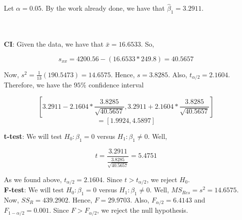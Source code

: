 Let $\alpha=0.05$. By the work already done, we have that $\hat{\beta}_1=3.2911$.\\\\

\begin{solution}\renewcommand{\qedsymbol}{}\ \\
    \textbf{CI}: Given the data, we have that $\bar{x}=16.6533$. So,
    
    $$s_{xx}=4200.56-(16.6533*249.8)=40.5657$$
    
    Now, $s^2=\frac{1}{13}(190.5473)=14.6575$. Hence, $s=3.8285$. Also, $t_{\alpha/2}=2.1604$.
    Therefore, we have the $95\%$ confidence interval
    
    $$[3.2911-2.1604*\frac{3.8285}{\sqrt{40.5657}},3.2911+2.1604*\frac{3.8285}{\sqrt{40.5657}}]$$
    $$=[1.9924,4.5897]$$

    \textbf{t-test}: We will test $H_0:\beta_1=0$ versus $H_1:\beta_1\neq0$. Well,
    
    $$t=\frac{3.2911}{\frac{3.8285}{\sqrt{40.5657}}}=5.4751$$
    
    As we found above, $t_{\alpha/2}=2.1604$. Since $t>t_{\alpha/2}$, we reject $H_0$.\\

    \textbf{F-test}: We will test $H_0:\beta_1=0$ versus $H_1:\beta_1\neq0$. Well,
    $MS_{Res}=s^2=14.6575$. Now, $SS_R=439.2902$. Hence, $F=29.9703$. Also, $F_{\alpha/2}=6.4143$ and
    $F_{1-\alpha/2}=0.001$. Since $F>F_{\alpha/2}$, we reject the null hypothesis.

\end{solution}